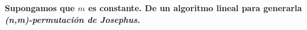 \textbf{Supongamos que $m$ es constante. De un algoritmo lineal para 
generarla \textit{(n,m)-permutación de Josephus}.}\\